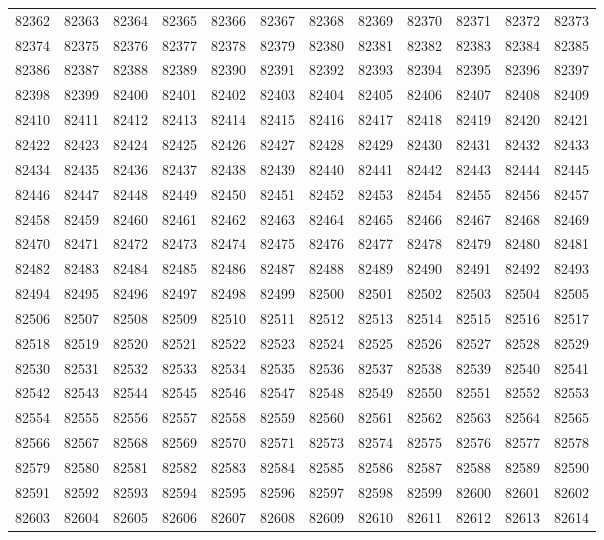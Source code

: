 \begin{center}
\begin{longtable}{llllllllllll}
82362 &82363 &82364 &82365 &82366 &82367 &82368 &82369 &82370 &82371 &82372 &82373 \\
82374 &82375 &82376 &82377 &82378 &82379 &82380 &82381 &82382 &82383 &82384 &82385 \\
82386 &82387 &82388 &82389 &82390 &82391 &82392 &82393 &82394 &82395 &82396 &82397 \\
82398 &82399 &82400 &82401 &82402 &82403 &82404 &82405 &82406 &82407 &82408 &82409 \\
82410 &82411 &82412 &82413 &82414 &82415 &82416 &82417 &82418 &82419 &82420 &82421 \\
82422 &82423 &82424 &82425 &82426 &82427 &82428 &82429 &82430 &82431 &82432 &82433 \\
82434 &82435 &82436 &82437 &82438 &82439 &82440 &82441 &82442 &82443 &82444 &82445 \\
82446 &82447 &82448 &82449 &82450 &82451 &82452 &82453 &82454 &82455 &82456 &82457 \\
82458 &82459 &82460 &82461 &82462 &82463 &82464 &82465 &82466 &82467 &82468 &82469 \\
82470 &82471 &82472 &82473 &82474 &82475 &82476 &82477 &82478 &82479 &82480 &82481 \\
82482 &82483 &82484 &82485 &82486 &82487 &82488 &82489 &82490 &82491 &82492 &82493 \\
82494 &82495 &82496 &82497 &82498 &82499 &82500 &82501 &82502 &82503 &82504 &82505 \\
82506 &82507 &82508 &82509 &82510 &82511 &82512 &82513 &82514 &82515 &82516 &82517 \\
82518 &82519 &82520 &82521 &82522 &82523 &82524 &82525 &82526 &82527 &82528 &82529 \\
82530 &82531 &82532 &82533 &82534 &82535 &82536 &82537 &82538 &82539 &82540 &82541 \\
82542 &82543 &82544 &82545 &82546 &82547 &82548 &82549 &82550 &82551 &82552 &82553 \\
82554 &82555 &82556 &82557 &82558 &82559 &82560 &82561 &82562 &82563 &82564 &82565 \\
82566 &82567 &82568 &82569 &82570 &82571 &82573 &82574 &82575 &82576 &82577 &82578 \\
82579 &82580 &82581 &82582 &82583 &82584 &82585 &82586 &82587 &82588 &82589 &82590 \\
82591 &82592 &82593 &82594 &82595 &82596 &82597 &82598 &82599 &82600 &82601 &82602 \\
82603 &82604 &82605 &82606 &82607 &82608 &82609 &82610 &82611 &82612 &82613 &82614 \\

\end{longtable}
\end{center}
